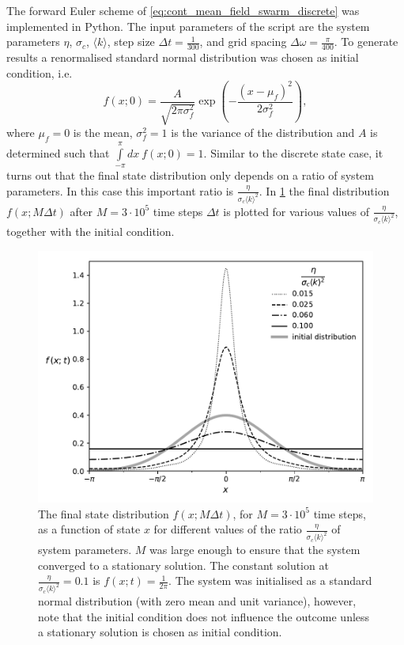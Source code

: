The forward Euler scheme of \cref{eq:cont_mean_field_swarm_discrete} was implemented in Python. The input parameters of the script are the system parameters $\eta$, $\sigma_c$, $\langle k \rangle$, step size $\Delta t = \frac{1}{300}$, and grid spacing $\Delta \omega = \frac{\pi}{400}$. To generate results a renormalised standard normal distribution was chosen as initial condition, i.e. 
\begin{equation}
f(x;0) = \frac{A}{\sqrt{2\pi\sigma_f^2}} \exp{\left(-\frac{(x-\mu_f)^2}{2\sigma_f^2}\right)},
\label{eq:gaussian}
\end{equation}
where $\mu_f = 0$ is the mean, $\sigma_f^2=1$ is the variance of the distribution and $A$ is determined such that $\int\limits_{-\pi}^\pi dx\ f(x;0) = 1$. Similar to the discrete state case, it turns out that the final state distribution only depends on a ratio of system parameters. In this case this important ratio is $\frac{\eta}{\sigma_c\langle k \rangle^2}$. In \cref{fig:cont_mean_field_final_dist} the final distribution $f(x;M\Delta t)$ after $M = 3\cdot 10^5$ time steps $\Delta t$ is plotted for various values of $\frac{\eta}{\sigma_c\langle k \rangle^2}$, together with the initial condition. 

\begin{figure}[tbp]
	\centering
	\includegraphics[width=0.7\linewidth]{figures/cont_mean_field_final_dist_BW}
	\caption{ The final state distribution $f(x;M\Delta t)$, for $M=3\cdot 10^5$ time steps, as a function of state $x$ for different values of the ratio $\frac{\eta}{\sigma_c\langle k \rangle^2}$ of system parameters. $M$ was large enough to ensure that the system converged to a stationary solution. The constant solution at $\frac{\eta}{\sigma_c\langle k \rangle^2} = 0.1$ is $f(x;t) = \frac{1}{2\pi}$. The system was initialised as a standard normal distribution (with zero mean and unit variance), however, note that the initial condition does not influence the outcome unless a stationary solution is chosen as initial condition.}
	\label{fig:cont_mean_field_final_dist}
\end{figure}

